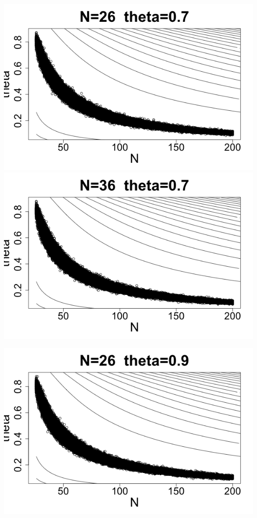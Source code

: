 \documentclass[letterpaper,10pt]{amsart}
\begin{document}
\begin{enumerate}[{1}.1]
\begin{center}
\end{center}
\begin{center}
\includegraphics[scale=0.25]{Stat221Impala4.png}
\includegraphics[scale=0.25]{Stat221Impala9.png}
\end{center}
\begin{center}
\includegraphics[scale=0.25]{Stat221Impala5.png}

\end{center}
\end{enumerate}
\end{document}

